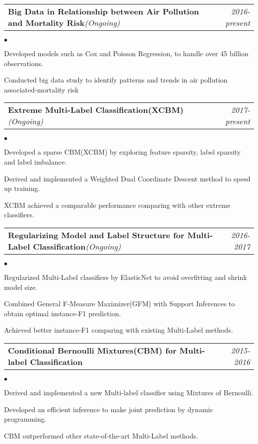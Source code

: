 \documentclass[11pt]{article}
\makeatletter
\newenvironment{achievements}{\begin{list}{$\bullet$}{\topsep 0pt \itemsep -2pt}}{\vspace*{4pt}\end{list}}
\newcommand{\headerrow}[2]
{\begin{tabular*}{\linewidth}{l@{\extracolsep{\fill}}r}
	\hspace*{-15pt}#1 & #2 \\
\end{tabular*}}
\newcommand{\headerrowww}[1]
{\begin{tabular*}{\linewidth}{l@{\extracolsep{\fill}}r}
	#1 &\\
\end{tabular*}}
\makeatother
\begin{document}
\headerrow
{\textbf{Big Data in Relationship between Air Pollution and Mortality Risk}\emph{(Ongoing)}}
{\emph{2016-present}}
\begin{achievements}
	\item Developed models such as Cox and Poisson Regression, to handle over 45 billion observations.
	\item Conducted big data study to identify patterns and trends in air pollution associated-mortality risk
\end{achievements}

\headerrow
{\textbf{Extreme Multi-Label Classification(XCBM)}\emph{(Ongoing)}}
{\emph{2017-present}}
\begin{achievements}
	\item Developed a sparse CBM(XCBM) by exploring feature sparsity, label sparsity and label imbalance. 
	\item Derived and implemented a Weighted Dual Coordinate Descent method to speed up training.
	\item XCBM achieved a comparable performance comparing with other extreme classifiers.
\end{achievements}

\headerrow
{\textbf{Regularizing Model and Label Structure for Multi-Label Classification}\emph{(Ongoing)}}
{\emph{2016-2017}}
\begin{achievements}
	\item Regularized Multi-Label classifiers by ElasticNet to avoid overfitting and shrink model size.
	\item Combined General F-Measure Maximizer(GFM) with Support Inferences to obtain optimal instance-F1 prediction.
	\item Achieved better instance-F1 comparing with existing Multi-Label methods. 
\end{achievements}

\headerrow
{\textbf{Conditional Bernoulli Mixtures(CBM) for Multi-label Classification}}
{\emph{2015-2016}}
\begin{achievements}
	\item Derived and implemented a new Multi-label classifier using Mixtures of Bernoulli.
	\item Developed an efficient inference to make joint prediction by dynamic programming.
	\item CBM outperformed other state-of-the-art Multi-Label methods.
\end{achievements}
\end{document}
